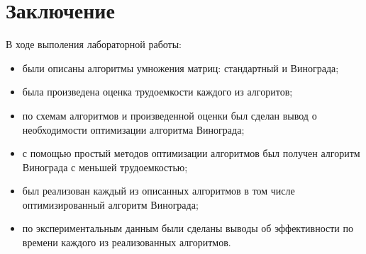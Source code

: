 \chapter*{Заключение}

В ходе выполения лабораторной работы:

\begin{itemize}[left=\parindent]
    \item были описаны алгоритмы умножения матриц: стандартный и Винограда;
    \item была произведена оценка трудоемкости каждого из алгоритов;
    \item по схемам алгоритмов и произведенной оценки был сделан вывод о необходимости оптимизации алгоритма Винограда;
    \item с помощью простый методов оптимизации алгоритмов был получен алгоритм Винограда с меньшей трудоемкостью;
    \item был реализован каждый из описанных алгоритмов в том числе оптимизированный алгоритм Винограда;
    \item по экспериментальным данным были сделаны выводы об эффективности по времени каждого из реализованных алгоритмов.
\end{itemize}
